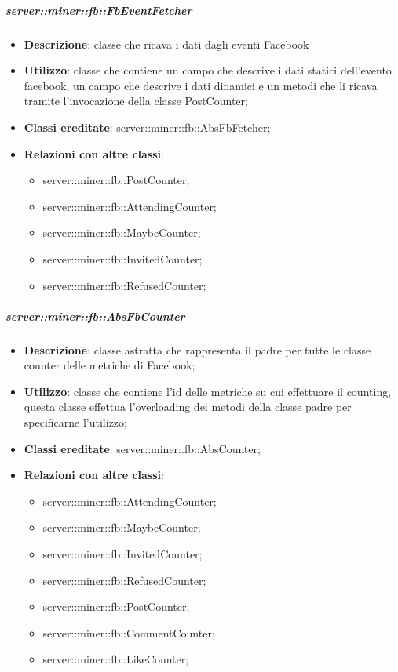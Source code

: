 		\subparagraph{server::miner::fb::FbEventFetcher} %
		\label{subp:server_miner_fb_FbEventFetcher}
			\begin{itemize}
				\item \textbf{Descrizione}: classe che ricava i dati dagli eventi Facebook
				\item \textbf{Utilizzo}: classe che contiene un campo che descrive i dati statici dell'evento facebook, un campo che descrive i dati dinamici e un metodi che li ricava tramite l'invocazione della classe PostCounter;
				\item \textbf{Classi ereditate}: server::miner::fb::AbsFbFetcher;
				\item \textbf{Relazioni con altre classi}:
					\begin{itemize}
						\item server::miner::fb::PostCounter;
						\item server::miner::fb::AttendingCounter;
						\item server::miner::fb::MaybeCounter;
						\item server::miner::fb::InvitedCounter;
						\item server::miner::fb::RefusedCounter;
					\end{itemize}
			\end{itemize}
	
		\subparagraph{server::miner::fb::AbsFbCounter} %
		\label{subp:server_miner_fb_AbsFbCounter}
			\begin{itemize}
				\item \textbf{Descrizione}: classe astratta che rappresenta il padre per tutte le classe counter delle metriche di Facebook;
				\item \textbf{Utilizzo}: classe che contiene l'id delle metriche su cui effettuare il counting, questa classe effettua l'overloading dei metodi della classe padre per specificarne l'utilizzo;
				\item \textbf{Classi ereditate}: server::miner:.fb::AbsCounter;
				\item \textbf{Relazioni con altre classi}:
					\begin{itemize}
						\item server::miner::fb::AttendingCounter;
						\item server::miner::fb::MaybeCounter;
						\item server::miner::fb::InvitedCounter;
						\item server::miner::fb::RefusedCounter;
						\item server::miner::fb::PostCounter;
						\item server::miner::fb::CommentCounter;
						\item server::miner::fb::LikeCounter;
					\end{itemize}
			\end{itemize}
	
